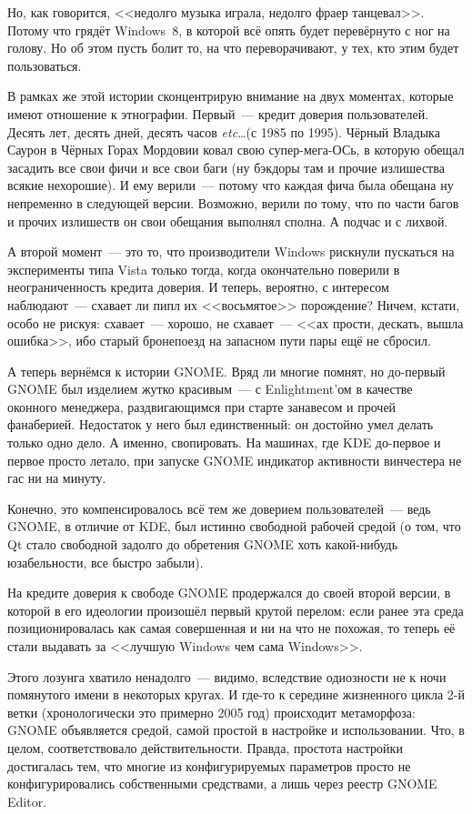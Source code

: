 Но, как говорится, <<недолго музыка играла, недолго фраер танцевал>>. Потому что грядёт Windows~8, в которой всё опять будет перевёрнуто с ног на голову. Но об этом пусть болит то, на что переворачивают, у тех, кто этим будет пользоваться.

В рамках же этой истории сконцентрирую внимание на двух моментах, которые имеют отношение к этнографии. Первый~--- кредит доверия пользователей. Десять лет, десять дней, десять часов \textit{etc}\dots (с 1985 по 1995). Чёрный Владыка Саурон в Чёрных Горах Мордовии ковал свою супер-мега-ОСь, в которую обещал засадить все свои фичи и все свои баги (ну бэкдоры там и прочие излишества всякие нехорошие). И ему верили~--- потому что каждая фича была обещана ну непременно в следующей версии. Возможно, верили по тому, что по части багов и прочих излишеств он свои обещания выполнял сполна. А подчас и с лихвой.

А второй момент~--- это то, что производители Windows рискнули пускаться на эксперименты типа Vista только тогда, когда окончательно поверили в неограниченность кредита доверия. И теперь, вероятно, с интересом наблюдают~--- схавает ли пипл их <<восьмятое>> порождение? Ничем, кстати, особо не рискуя: схавает~--- хорошо, не схавает~--- <<ах прости, дескать, вышла ошибка>>, ибо старый бронепоезд на запасном пути пары ещё не сбросил.

А теперь вернёмся к истории GNOME. Вряд ли многие помнят, но до-первый GNOME был изделием жутко красивым~--- с Enlightment'ом в качестве оконного менеджера, раздвигающимся при старте занавесом и прочей фанаберией. Недостаток у него был единственный: он достойно умел делать только одно дело. А именно, свопировать. На машинах, где KDE до-первое и первое просто летало, при запуске GNOME индикатор активности винчестера не гас ни на минуту.

Конечно, это компенсировалось всё тем же доверием пользователей~--- ведь GNOME, в отличие от KDE, был истинно свободной рабочей средой (о том, что Qt стало свободной задолго до обретения GNOME хоть какой-нибудь юзабельности, все быстро забыли).

На кредите доверия к свободе GNOME продержался до своей второй версии, в которой в его идеологии произошёл первый крутой перелом: если ранее эта среда позиционировалась как самая совершенная и ни на что не похожая, то теперь её стали выдавать за <<лучшую Windows чем сама Windows>>.

Этого лозунга хватило ненадолго~--- видимо, вследствие одиозности не к ночи помянутого имени в некоторых кругах. И где-то к середине жизненного цикла 2-й ветки (хронологически это примерно 2005 год) происходит метаморфоза: GNOME объявляется средой, самой простой в настройке и использовании. Что, в целом, соответствовало действительности. Правда, простота настройки достигалась тем, что многие из конфигурируемых параметров просто не конфигурировались собственными средствами, а лишь через реестр GNOME Editor.

